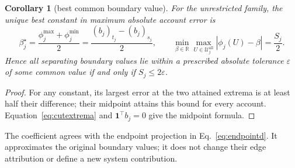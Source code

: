 \documentclass[a4paper,fleqn]{cas-sc}
\newtheorem{corollary}[theorem]{Corollary}
\begin{document}
\begin{corollary}[best common boundary value]\label{cor:approxinterchange}
For the unrestricted family, the unique best constant in maximum absolute
account error is
\[
\beta_j^\star=\frac{\phi_j^{\max}+\phi_j^{\min}}2
=\frac{(b_j)_{t_j}-(b_j)_{s_j}}2,\qquad
\min_{\beta\in\mathbb R}\max_{U\in\mathcal U_j^{\mathrm{all}}}
|\phi_j(U)-\beta|=\frac{S_j}{2}.
\]
Hence all separating boundary values lie within a prescribed absolute tolerance
$\varepsilon$ of some common value if and only if $S_j\le2\varepsilon$.
\end{corollary}
\begin{proof}
For any constant, its largest error at the two attained extrema is at least
half their difference; their midpoint attains this bound for every account.
Equation~\eqref{eq:cutextrema} and $\mathbf1^\top b_j=0$ give the midpoint formula.
\end{proof}
The coefficient agrees with the endpoint projection in
Eq.~\eqref{eq:endpointd}. It approximates the original boundary values; it does
not change their edge attribution or define a new system contribution.
\end{document}

